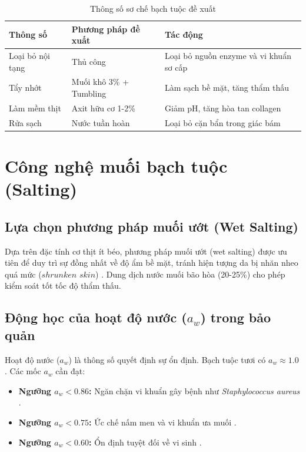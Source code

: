 \documentclass[12pt,a4paper]{report}
\begin{document}
\begin{table}[H]
	\centering
	\caption{Thông số sơ chế bạch tuộc đề xuất}
	\begin{tabular}{lp{5cm}p{6cm}}
		\toprule
		\textbf{Thông số} & \textbf{Phương pháp đề xuất} & \textbf{Tác động} \\
		\midrule
		Loại bỏ nội tạng & Thủ công & Loại bỏ nguồn enzyme và vi khuẩn sơ cấp \cite{octopus_methods} \\
		Tẩy nhớt & Muối khô 3\% + Tumbling & Làm sạch bề mặt, tăng thẩm thấu \cite{octopus_patent} \\
		Làm mềm thịt & Axit hữu cơ 1-2\% & Giảm pH, tăng hòa tan collagen \cite{octopus_texture} \\
		Rửa sạch & Nước tuần hoàn & Loại bỏ cặn bẩn trong giác bám \cite{octopus_patent} \\
		\bottomrule
	\end{tabular}
\end{table}

\section{Công nghệ muối bạch tuộc (Salting)}

\subsection{Lựa chọn phương pháp muối ướt (Wet Salting)}

Dựa trên đặc tính cơ thịt ít béo, phương pháp muối ướt (wet salting) được ưu tiên để duy trì sự đồng nhất về độ ẩm bề mặt, tránh hiện tượng da bị nhăn nheo quá mức ($shrunken$ $skin$) \cite{wet_salting}. Dung dịch nước muối bão hòa (20-25\%) cho phép kiểm soát tốt tốc độ thẩm thấu.

\subsection{Động học của hoạt độ nước ($a_w$) trong bảo quản}

Hoạt độ nước ($a_w$) là thông số quyết định sự ổn định. Bạch tuộc tươi có $a_w \approx 1.0$ \cite{aw_test}. Các mốc $a_w$ cần đạt:
\begin{itemize}
	\item \textbf{Ngưỡng $a_w < 0.86$:} Ngăn chặn vi khuẩn gây bệnh như \textit{Staphylococcus aureus} \cite{aw_test}.
	\item \textbf{Ngưỡng $a_w < 0.75$:} Ức chế nấm men và vi khuẩn ưa muối \cite{aw_test}.
	\item \textbf{Ngưỡng $a_w < 0.60$:} Ổn định tuyệt đối về vi sinh \cite{aw_test}.
\end{itemize}
\end{document}
